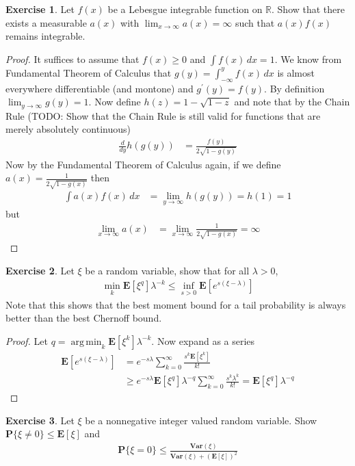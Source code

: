 \documentclass{amsbook}
\DeclareMathOperator*{\argmin}{arg\,min}
\theoremstyle{definition}
\newtheorem{xca}{Exercise}
\theoremstyle{remark}
\newcommand{\expectation}[1]{\textbf{E}\left[#1\right]}
\newcommand{\variance}[1]{\textbf{Var} \left (#1 \right )}
\newcommand{\probability}[1]{\textbf{P}\{#1\}}
\newcommand{\reals}{\mathbb{R}}
\begin{document}
\begin{xca}Let $f(x)$ be a Lebesgue integrable function on $\reals$.
  Show that there exists a measurable $a(x)$ with $\lim_{x \to \infty}
  a(x) = \infty$ such that $a(x)f(x)$ remains integrable.
\end{xca}
\begin{proof}
It suffices to assume that $f(x) \geq 0$ and $\int f(x) \, dx = 1$.
We know from Fundamental Theorem of Calculus that $g(y) = \int_{-\infty}^y
f(x) \, dx$ is almost everywhere differentiable (and montone) and
$g^\prime(y) = f(y)$.   By
definition $\lim_{y \to \infty} g(y) = 1$.  Now define $h(z) = 1 -
\sqrt{1 -z}$ and note that by the Chain Rule (TODO: Show that the
Chain Rule is still valid for functions that are merely absolutely continuous)
\begin{align*}
\frac{d}{dy} h(g(y)) &= \frac{f(y)}{2 \sqrt{1 - g(y)}}
\end{align*}
Now by the Fundamental Theorem of Calculus again, if we define $a(x) =
\frac{1}{2 \sqrt{1 - g(x)}}$ 
then 
\begin{align*}
\int a(x) f(x) \, dx &= \lim_{y \to \infty} h(g(y)) = h(1) = 1
\end{align*}
but 
\begin{align*}
\lim_{x \to \infty} a(x) &= \lim_{x \to \infty} \frac{1}{2 \sqrt{1 -
    g(x)}} = \infty
\end{align*}
\end{proof}
\begin{xca}Let $\xi$ be a random variable, show that for all $\lambda > 0$,
\begin{align*}
\min_k \expectation{\xi^q} \lambda^{-k} \leq \inf_{s>0} \expectation{e^{s(\xi-\lambda)}}
\end{align*}
Note that this shows that the best moment bound for a tail
probability is always better than the best Chernoff bound.
\end{xca}
\begin{proof}
Let $q = \argmin_k \expectation{\xi^k} \lambda^{-k}$.  Now expand as a
series
\begin{align*}
\expectation{e^{s(\xi-\lambda)}} &= e^{-s\lambda} \sum_{k=0}^\infty
\frac{s^k \expectation{\xi^k}}{k!} \\
& \geq e^{-s\lambda} \expectation{\xi^q} \lambda^{-q} \sum_{k=0}^\infty
\frac{s^k \lambda^k}{k!} = \expectation{\xi^q} \lambda^{-q}
\end{align*}
\end{proof}
\begin{xca}Let $\xi$ be a nonnegative integer valued random variable.
  Show $\probability{\xi \neq 0} \leq \expectation{\xi}$ and 
\begin{align*}
\probability{\xi = 0} \leq \frac{\variance{\xi}}{\variance{\xi} + \left(\expectation{\xi}\right)^2}
\end{align*}
\end{xca}
\end{document}
